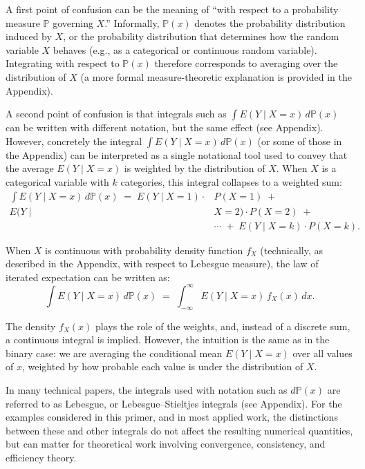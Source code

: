\documentclass[12pt]{article}
\numberwithin{equation}{section}
\begin{document}
A first point of confusion can be the meaning of ``with respect to a probability measure $\mathbb{P}$ governing $X$.'' Informally, $\mathbb{P}(x)$ denotes the probability distribution induced by $X$, or the probability distribution that determines how the random variable $X$ behaves (e.g., as a categorical or continuous random variable). Integrating with respect to $\mathbb{P}(x)$ therefore corresponds to averaging over the distribution of $X$ (a more formal measure-theoretic explanation is provided in the Appendix). 

A second point of confusion is that integrals such as $\int E(Y\mid X=x)\,d\mathbb{P}(x)$ can be written with different notation, but the same effect (see Appendix). However, concretely the integral $\int E(Y\mid X=x)\,d\mathbb{P}(x)$ (or some of those in the Appendix) can be interpreted as a single notational tool used to convey that the average $E(Y \mid X = x)$ is weighted by the distribution of $X$. When $X$ is a categorical variable with $k$ categories, this integral collapses to a weighted sum:
\begin{align*}
	\int E(Y\mid X=x)\,d\mathbb{P}(x) \;=\; E(Y\mid X=1)\cdot & P(X=1)  \;+\; \\ E(Y\mid& X=2) \cdot P(X=2)  \;+\; \\ & \cdots \;+\; E(Y\mid X=k)\cdot P(X= k).
\end{align*}

\noindent When $X$ is continuous with probability density function $f_X$ (technically, as described in the Appendix, with respect to Lebesgue measure), the law of iterated expectation can be written as:
\begin{equation}
\int E(Y\mid X=x)\,d\mathbb{P}(x) \;=\; \int_{-\infty}^{\infty} E(Y\mid X=x)\,f_X(x)\,dx.
\end{equation}

\noindent The density $f_X(x)$ plays the role of the weights, and, instead of a discrete sum, a continuous integral is implied. However, the intuition is the same as in the binary case: we are averaging the conditional mean $E(Y\mid X=x)$ over all values of $x$, weighted by how probable each value is under the distribution of $X$. 

In many technical papers, the integrals used with notation such as $d\mathbb{P}(x)$ are referred to as Lebesgue, or Lebesgue--Stieltjes integrals (see Appendix). For the examples considered in this primer, and in most applied work, the distinctions between these and other integrals do not affect the resulting numerical quantities, but can matter for theoretical work involving convergence, consistency, and efficiency theory.\cite{Vaart2000}
\end{document}
